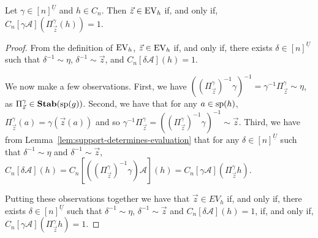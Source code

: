 \documentclass[../paper.tex]{subfiles}
\begin{document}
\begin{lem}
	Let $\gamma\in [n]^{\underline{U}}$ and $h \in C_n$. Then $\vec{z} \in \text{EV}_h$
  if, and only if, $C_n[\gamma \mathcal{A}](\Pi^{\gamma}_{\vec{z}} (h)) = 1$.
  \label{lem:translate-EV-circuits}
\end{lem}
\begin{proof}
  From the definition of $\text{EV}_h$, $\vec{z} \in \text{EV}_h$ if, and only if, there
  exists $\delta \in [n]^{\underline{U}}$ such that $\delta^{-1} \sim \eta$,
  $\delta^{-1} \sim \vec{z}$, and $C_n[\delta \mathcal{A}](h) = 1$.

  We now make a few observations. First, we have $((\Pi^{\gamma}_{\vec{z}})^{-1}
  \gamma)^{-1} = \gamma^{-1}\Pi^{\gamma}_{\vec{z}} \sim \eta$, as
  $\Pi^{\gamma}_{\vec{z}} \in \text{\textbf{Stab}} (\text{sp} (g))$. Second, we have that for any $a \in
  \text{sp}(h)$, $\Pi^{\gamma}_{\vec{z}}(a) = \gamma (\vec{z}(a))$ and so
  $\gamma^{-1}\Pi^{\gamma}_{\vec{z}} = ((\Pi^{\gamma}_{\vec{z}})^{-1}
  \gamma)^{-1} \sim \vec{z}$. Third, we have from
  Lemma~\ref{lem:support-determines-evaluation} that for any $\delta \in
  [n]^{\underline{U}}$ such that $\delta^{-1} \sim \eta$ and $\delta^{-1} \sim
  \vec{z}$, $C_n[\delta \mathcal{A}](h) =
  C_n[((\Pi^{\gamma}_{\vec{z}})^{-1}\gamma) \mathcal{A}](h) = C_n[\gamma
  \mathcal{A}](\Pi^{\gamma}_{\vec{z}}h)$.

  Putting these observations together we have that $\vec{z} \in EV_h$ if, and
  only if, there exists $\delta \in [n]^{\underline{U}}$ such that $\delta^{-1}
  \sim \eta$, $\delta^{-1} \sim \vec{z}$ and $C_n[\delta \mathcal{A}](h) = 1$,
  if, and only if, $C_n[\gamma \mathcal{A}](\Pi^{\gamma}_{\vec{z}}h) = 1$.







  
\end{proof}
\end{document}
